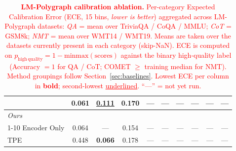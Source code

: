 \begin{table}[!t]
{\begin{tabular}{l *{3}{c} *{3}{c} *{3}{c}}
                                 & \textbf{0.061} & \underline{0.111} & 0.170 & --- & --- & --- & --- & --- & --- \\
\midrule
\multicolumn{10}{l}{\textit{Ours}} \\
\cmidrule(l){1-10}
Encoder Only                     & 0.064 & ---   & 0.154 & --- & --- & --- & --- & --- & --- \\
TPE                         & 0.448 & \textbf{0.066} & 0.178 & --- & --- & --- & --- & --- & --- \\
\bottomrule
\end{tabular}%
}
\caption{\textcolor{red}{\textbf{LM-Polygraph calibration ablation.}
Per-category Expected Calibration Error (ECE, 15 bins, \emph{lower is
better}) aggregated across LM-Polygraph datasets: \emph{QA} = mean over
TriviaQA / CoQA / MMLU; \emph{CoT} = GSM8k; \emph{NMT} = mean over WMT14 /
WMT19. Means are taken over the datasets currently present in each category
(skip-NaN). ECE is computed on
$p_{\mathrm{high\,quality}} = 1 - \mathrm{minmax}(\text{scores})$ against
the binary high-quality label (Accuracy $=1$ for QA / CoT; COMET $\geq$
training median for NMT). Method groupings follow
Section~\ref{sec:baselines}. Lowest ECE per column in \textbf{bold};
second-lowest \underline{underlined}. ``---'' = not yet run.}}
\label{tab:polygraph_ece}
\end{table}
